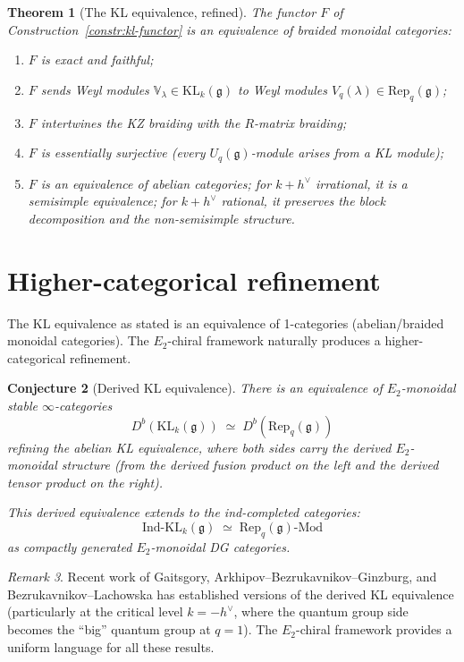 \documentclass[11pt]{article}
\newtheorem{theorem}{Theorem}[section]
\newtheorem{conjecture}[theorem]{Conjecture}
\theoremstyle{definition}
\theoremstyle{remark}
\newtheorem{remark}[theorem]{Remark}
\newcommand{\Mod}{\mathrm{Mod}}
\newcommand{\Rep}{\mathrm{Rep}}
\newcommand{\Ind}{\mathrm{Ind}}
\newcommand{\Uq}{U_q}
\newcommand{\frakg}{\mathfrak{g}}
\newcommand{\KL}{\mathrm{KL}}
\newcommand{\hv}{h^\vee}
\begin{document}
\begin{theorem}[The KL equivalence, refined]
\label{thm:kl-refined}
The functor $F$ of Construction~\ref{constr:kl-functor} is an
equivalence of braided monoidal categories:
\begin{enumerate}[label=(\roman*)]
 \item $F$ is exact and faithful;
 \item $F$ sends Weyl modules $\mathbb{V}_\lambda \in \KL_k(\frakg)$
 to Weyl modules $V_q(\lambda) \in \Rep_q(\frakg)$;
 \item $F$ intertwines the KZ braiding with the $R$-matrix braiding;
 \item $F$ is essentially surjective (every $\Uq(\frakg)$-module
 arises from a KL module);
 \item $F$ is an equivalence of abelian categories; for $k + \hv$
 irrational, it is a semisimple equivalence; for $k + \hv$ rational,
 it preserves the block decomposition and the non-semisimple structure.
\end{enumerate}
\end{theorem}

\section{Higher-categorical refinement}
\label{sec:higher-categorical}

The KL equivalence as stated is an equivalence of 1-categories
(abelian/braided monoidal categories). The $E_2$-chiral framework
naturally produces a higher-categorical refinement.

\begin{conjecture}[Derived KL equivalence]
\label{conj:derived-kl}
There is an equivalence of $E_2$-monoidal stable $\infty$-categories
\[
 D^b(\KL_k(\frakg)) \;\simeq\; D^b(\Rep_q(\frakg))
\]
refining the abelian KL equivalence, where both sides carry the
derived $E_2$-monoidal structure (from the derived fusion product
on the left and the derived tensor product on the right).

This derived equivalence extends to the \emph{ind-completed}
categories:
\[
 \Ind\text{-}\KL_k(\frakg) \;\simeq\; \Rep_q(\frakg)\text{-}\Mod
\]
as compactly generated $E_2$-monoidal DG categories.
\end{conjecture}

\begin{remark}
Recent work of Gaitsgory, Arkhipov--Bezrukavnikov--Ginzburg, and
Bezrukavnikov--Lachowska has established versions of the derived KL
equivalence (particularly at the critical level $k = -\hv$, where
the quantum group side becomes the ``big'' quantum group at $q = 1$).
The $E_2$-chiral framework provides a uniform language for all these
results.
\end{remark}
\end{document}

